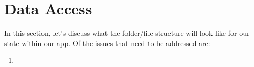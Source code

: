 \maketitle{}
\section{ Data Access }

In this section, let's discuss what the folder/file structure will look like
for our state within our app. Of the issues that need to be addressed are:
\begin{enumerate}
  \item 
\end{enumerate}
